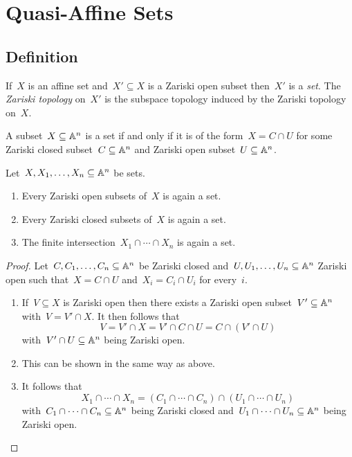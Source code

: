 \section{Quasi-Affine Sets}





\subsection{Definition}


\begin{definition}
  If~$X$ is an affine set and~$X' \subseteq X$ is a Zariski open subset then~$X'$ is a \emph{{\qaffine} set}.
  The \emph{Zariski topology} on~$X'$ is the subspace topology induced by the Zariski topology on~$X$.
\end{definition}


\begin{remark}
  A subset~$X \subseteq \mathbb{A}^n$ is a {\qaffine} set if and only if it is of the form~$X = C \cap U$ for some Zariski closed subset~$C \subseteq \mathbb{A}^n$ and Zariski open subset~$U \subseteq \mathbb{A}^n$.
\end{remark}


\begin{corollary}
  Let~$X, X_1, \dotsc, X_n \subseteq \mathbb{A}^n$ be {\qaffine} sets.
  \begin{enumerate}
    \item
      Every Zariski open subsets of~$X$ is again a {\qaffine} set.
    \item
      Every Zariski closed subsets of~$X$ is again a {\qaffine} set.
    \item
      The finite intersection~$X_1 \cap \dotsb \cap X_n$ is again a {\qaffine} set.
  \end{enumerate}
\end{corollary}


\begin{proof}
  Let~$C, C_1, \dotsc, C_n \subseteq \mathbb{A}^n$ be Zariski closed and~$U, U_1, \dotsc, U_n \subseteq \mathbb{A}^n$ Zariski open such that~$X = C \cap U$ and~$X_i = C_i \cap U_i$ for every~$i$.
  \begin{enumerate}
    \item
      If~$V \subseteq X$ is Zariski open then there exists a Zariski open subset~$V' \subseteq \mathbb{A}^n$ with~$V = V' \cap X$.
      It then follows that
      \[
          V
        = V' \cap X
        = V' \cap C \cap U
        = C \cap (V' \cap U)
      \]
      with~$V' \cap U \subseteq \mathbb{A}^n$ being Zariski open.
    \item
      This can be shown in the same way as above.
    \item
      It follows that
      \[
          X_1 \cap \dotsb \cap X_n
        = (C_1 \cap \dotsb \cap C_n) \cap (U_1 \cap \dotsb \cap U_n)
      \]
      with~$C_1 \cap \dotsb \cap C_n \subseteq \mathbb{A}^n$ being Zariski closed and~$U_1 \cap \dotsb \cap U_n \subseteq \mathbb{A}^n$ being Zariski open.
    \qedhere
  \end{enumerate}
\end{proof}


